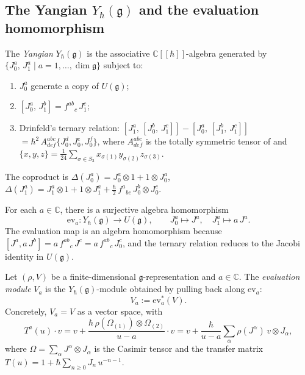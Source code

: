 \subsection{The Yangian $Y_\hbar(\mathfrak{g})$ and the evaluation homomorphism}

\begin{definition}
\label{def:yangian-drinfeld}
The \emph{Yangian} $Y_\hbar(\mathfrak{g})$ is the associative
$\mathbb{C}[\![\hbar]\!]$-algebra generated by
$\{J^a_0,\,J^a_1\mid a=1,\dots,\dim\mathfrak{g}\}$
subject to:
\begin{enumerate}[label=(\roman*)]
\item $J^a_0$ generate a copy of $U(\mathfrak{g})$;
\item $[J^a_0,\,J^b_1]=f^{ab}{}_c\,J^c_1$;
\item Drinfeld's ternary relation:
$[J^a_1,\,[J^b_0,\,J^c_1]]-[J^a_0,\,[J^b_1,\,J^c_1]]$
$=\hbar^2\,A^{abc}_{def}\{J^d_0,J^e_0,J^f_0\}$,
where $A^{abc}_{def}$ is the totally symmetric tensor
of \textup{\cite{Drinfeld-Yangians}} and
$\{x,y,z\}=\tfrac{1}{24}\sum_{\sigma\in S_3}x_{\sigma(1)}y_{\sigma(2)}z_{\sigma(3)}$.
\end{enumerate}
The coproduct is
$\Delta(J^a_0)=J^a_0\otimes 1+1\otimes J^a_0$,
$\Delta(J^a_1)=J^a_1\otimes 1+1\otimes J^a_1
+\tfrac{\hbar}{2}\,f^a{}_{bc}\,J^b_0\otimes J^c_0$.
\end{definition}

\begin{construction}
\ClaimStatusProvedHere
\label{constr:evaluation-map}
For each $a\in\mathbb{C}$, there is a surjective algebra
homomorphism
\[
\mathrm{ev}_a\colon
Y_\hbar(\mathfrak{g})\longrightarrow U(\mathfrak{g}),
\qquad
J^a_0\mapsto J^a,
\quad
J^a_1\mapsto a\,J^a.
\]
The evaluation map is an algebra homomorphism because
$[J^a,a\,J^b]=a\,f^{ab}{}_c\,J^c=a\,f^{ab}{}_c\,J^c_0$,
and the ternary relation reduces to the Jacobi identity in
$U(\mathfrak{g})$.
\end{construction}

\begin{definition}
\label{def:evaluation-module}
\ClaimStatusDefinitional
Let $(\rho,V)$ be a finite-dimensional
$\mathfrak{g}$-representation and $a\in\mathbb{C}$.
The \emph{evaluation module} $V_a$ is the
$Y_\hbar(\mathfrak{g})$-module obtained by pulling back
along $\mathrm{ev}_a$:
\[
V_a
:=
\mathrm{ev}_a^*(V).
\]
Concretely, $V_a=V$ as a vector space, with
\begin{equation}\label{eq:eval-transfer-matrix}
T^a(u)\cdot v
=
v+\frac{\hbar\,\rho(\Omega_{(1)})\otimes\Omega_{(2)}}{u-a}\cdot v
=
v+\frac{\hbar}{u-a}\sum_\alpha
\rho(J^\alpha)\,v\otimes J_\alpha,
\end{equation}
where $\Omega=\sum_\alpha J^\alpha\otimes J_\alpha$
is the Casimir tensor and the transfer matrix
$T(u)=1+\hbar\sum_{n\geq 0}J_n\, u^{-n-1}$.
\end{definition}

